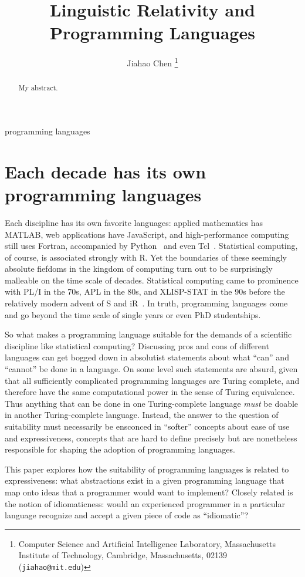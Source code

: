 \documentclass[11pt]{asaproc}
\title{Linguistic Relativity and Programming Languages}
\author{
    Jiahao Chen
    \thanks{Computer Science and Artificial Intelligence Laboratory,
               Massachusetts Institute of Technology,
               Cambridge, Massachusetts, 02139 ({\tt jiahao@mit.edu})}
}
\begin{document}
\maketitle

\begin{abstract}
My abstract.
\end{abstract}

\begin{keywords}
    programming languages
\end{keywords}

\section{Each decade has its own programming languages}

Each discipline has its own favorite languages: applied mathematics has MATLAB,
web applications have JavaScript, and high-performance computing still uses
Fortran, accompanied by Python~\cite{scipy} and even Tcl~\cite{Phillips2014}.
Statistical computing, of course, is associated strongly with R. Yet the
boundaries of these seemingly absolute fiefdoms in the kingdom of computing
turn out to be surprisingly malleable on the time scale of decades. Statistical
computing came to prominence with PL/I in the 70s, APL in the 80s, and
XLISP-STAT in the 90s before the relatively modern advent of S and
iR~\cite{deLeeuw2005}. In truth, programming languages come and go beyond the
time scale of single years or even PhD studentships.

So what makes a programming language suitable for the demands of a scientific
discipline like statistical computing?  Discussing pros and cons of different
languages can get bogged down in absolutist statements about what ``can'' and
``cannot'' be done in a language. On some level such statements are absurd,
given that all sufficiently complicated programming languages are Turing
complete, and therefore have the same computational power in the sense of
Turing equivalence. Thus anything that can be done in one Turing-complete
language \textit{must} be doable in another Turing-complete language. Instead,
the answer to the question of suitability must necessarily be ensconced in
``softer'' concepts about ease of use and expressiveness, concepts that are
hard to define precisely but are nonetheless responsible for shaping the
adoption of programming languages.

This paper explores how the suitability of programming languages is related to
expressiveness: what abstractions exist in a given programming language that
map onto ideas that a programmer would want to implement? Closely related is
the notion of idiomaticness: would an experienced programmer in a particular
language recognize and accept a given piece of code as ``idiomatic''?
\end{document}
